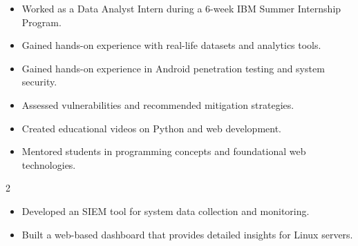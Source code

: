\documentclass[10pt,a4paper,ragged2e]{maltacv}
\begin{document}
\divider

\begin{itemize}
  \item Worked as a Data Analyst Intern during a 6-week IBM Summer Internship Program.
  \item Gained hands-on experience with real-life datasets and analytics tools.
\end{itemize}

\divider

\begin{itemize}
  \item Gained hands-on experience in Android penetration testing and system security.
  \item Assessed vulnerabilities and recommended mitigation strategies.
\end{itemize}

\divider

\begin{itemize}
  \item Created educational videos on Python and web development.
  \item Mentored students in programming concepts and foundational web technologies.
\end{itemize}

\divider

\medskip
\begin{multicols}{2}
\end{multicols}

\begin{itemize}
  \item Developed an SIEM tool for system data collection and monitoring.
  \item Built a web-based dashboard that provides detailed insights for Linux servers.
\end{itemize}
\end{document}
